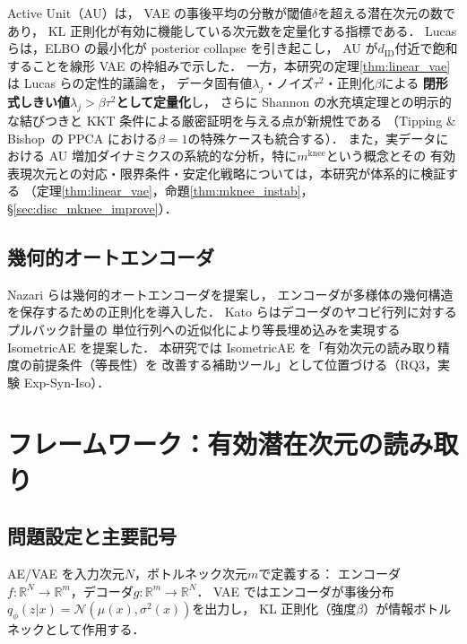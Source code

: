 \documentclass[11pt,a4paper]{jsarticle}
\newcommand{\R}{\mathbb{R}}
\newcommand{\mknee}{m^{\mathrm{knee}}}
\begin{document}
Active Unit（AU）\cite{lucas2019elbo,higgins2017betavae}は，
VAE の事後平均の分散が閾値$\delta$を超える潜在次元の数であり，
KL 正則化が有効に機能している次元数を定量化する指標である．
Lucas ら\cite{lucas2019elbo}は，ELBO の最小化が posterior collapse を引き起こし，
AU が$d_{\mathrm{ID}}$付近で飽和することを線形 VAE の枠組みで示した．
一方，本研究の定理\ref{thm:linear_vae}は Lucas らの定性的議論を，
データ固有値$\lambda_j$・ノイズ$\tau^2$・正則化$\beta$による
\textbf{閉形式しきい値$\lambda_j > \beta\tau^2$として定量化}し，
さらに Shannon の水充填定理との明示的な結びつきと KKT 条件による厳密証明を与える点が新規性である
（Tipping \& Bishop~\cite{tippingbishop1999ppca}の PPCA における$\beta=1$の特殊ケースも統合する）．
また，実データにおける AU 増加ダイナミクスの系統的な分析，特に$\mknee$という概念とその
有効表現次元との対応・限界条件・安定化戦略については，本研究が体系的に検証する
（定理\ref{thm:linear_vae}，命題\ref{thm:mknee_instab}，§\ref{sec:disc_mknee_improve}）．

\subsection{幾何的オートエンコーダ}\label{sec:related_geo}

Nazari ら\cite{nazari2023geometric}は幾何的オートエンコーダを提案し，
エンコーダが多様体の幾何構造を保存するための正則化を導入した．
Kato ら\cite{kato2020rdae}はデコーダのヤコビ行列に対するプルバック計量の
単位行列への近似化により等長埋め込みを実現する IsometricAE を提案した．
本研究では IsometricAE を「有効次元の読み取り精度の前提条件（等長性）を
改善する補助ツール」として位置づける（RQ3，実験 Exp-Syn-Iso）．

\section{フレームワーク：有効潜在次元の読み取り}\label{sec:framework}

\subsection{問題設定と主要記号}\label{sec:framework_setup}

AE/VAE を入力次元$N$，ボトルネック次元$m$で定義する：
エンコーダ$f: \R^N \to \R^m$，デコーダ$g: \R^m \to \R^N$．
VAE ではエンコーダが事後分布$q_\phi(z|x) = \mathcal{N}(\mu(x), \sigma^2(x))$を出力し，
KL 正則化（強度$\beta$）が情報ボトルネックとして作用する．
\end{document}
